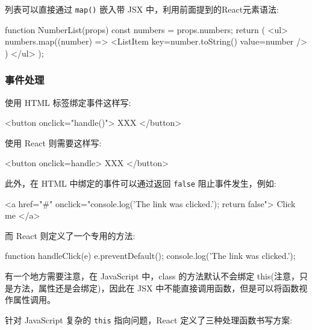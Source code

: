 列表可以直接通过 \texttt{map()} 嵌入带 JSX 中，利用前面提到的React元素语法:

\begin{JavaScript}
function NumberList(props) {
  const numbers = props.numbers;
  return (
    <ul>
      {numbers.map((number) =>
        <ListItem key={number.toString()}
                  value={number} />
      )}
    </ul>
  );
}
\end{JavaScript}

\subsubsection{事件处理}

使用 HTML 标签绑定事件这样写:

\begin{HTML}
<button onclick="handle()"> XXX </button>
\end{HTML}

使用 React 则需要这样写:

\begin{JavaScript}
<button onclick={handle}> XXX </button>
\end{JavaScript}

此外，在 HTML 中绑定的事件可以通过返回 \texttt{false} 阻止事件发生，例如:

\begin{HTML}
<a href="#" onclick="console.log('The link was clicked.'); return false">
  Click me
</a>
\end{HTML}

而 React 则定义了一个专用的方法:

\begin{JavaScript}
function handleClick(e) {
  e.preventDefault();
  console.log('The link was clicked.');
}
\end{JavaScript}

有一个地方需要注意，在 JavaScript 中，class 的方法默认不会绑定 this(注意，只是方法，属性还是会绑定)，因此在 JSX 中不能直接调用函数，但是可以将函数视作属性调用。

针对 JavaScript 复杂的 \texttt{this} 指向问题，React 定义了三种处理函数书写方案:

